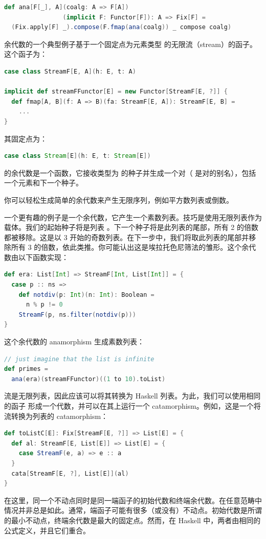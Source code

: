 \begin{lstlisting}[language=Scala]
def ana[F[_], A](coalg: A => F[A])
                (implicit F: Functor[F]): A => Fix[F] =
  (Fix.apply[F] _).compose(F.fmap(ana(coalg)) _ compose coalg)
\end{lstlisting}
余代数的一个典型例子基于一个固定点为元素类型  的无限流（stream）的函子。这个函子为：

\begin{lstlisting}[language=Scala]
case class StreamF[E, A](h: E, t: A)

implicit def streamFFunctor[E] = new Functor[StreamF[E, ?]] {
  def fmap[A, B](f: A => B)(fa: StreamF[E, A]): StreamF[E, B] =
    ...
}
\end{lstlisting}
其固定点为：

\begin{lstlisting}[language=Scala]
case class Stream[E](h: E, t: Stream[E])
\end{lstlisting}
 的余代数是一个函数，它接收类型为  的种子并生成一个对（ 是对的别名），包括一个元素和下一个种子。

你可以轻松生成简单的余代数来产生无限序列，例如平方数列表或倒数。

一个更有趣的例子是一个余代数，它产生一个素数列表。技巧是使用无限列表作为载体。我们的起始种子将是列表 \code{{[}2..{]}}。下一个种子将是此列表的尾部，所有 2 的倍数都被移除。这是以 3 开始的奇数列表。在下一步中，我们将取此列表的尾部并移除所有 3 的倍数，依此类推。你可能认出这是埃拉托色尼筛法的雏形。这个余代数由以下函数实现：

\begin{lstlisting}[language=Scala]
def era: List[Int] => StreamF[Int, List[Int]] = {
  case p :: ns =>
    def notdiv(p: Int)(n: Int): Boolean =
      n % p != 0
    StreamF(p, ns.filter(notdiv(p)))
}

\end{lstlisting}
这个余代数的 anamorphism 生成素数列表：

\begin{lstlisting}[language=Scala]
// just imagine that the list is infinite
def primes =
  ana(era)(streamFFunctor)((1 to 10).toList)
\end{lstlisting}
流是无限列表，因此应该可以将其转换为 Haskell 列表。为此，我们可以使用相同的函子  形成一个代数，并可以在其上运行一个 catamorphism。例如，这是一个将流转换为列表的 catamorphism：

\begin{lstlisting}[language=Scala]
def toListC[E]: Fix[StreamF[E, ?]] => List[E] = {
  def al: StreamF[E, List[E]] => List[E] = {
    case StreamF(e, a) => e :: a
  }
  cata[StreamF[E, ?], List[E]](al)
}
\end{lstlisting}
在这里，同一个不动点同时是同一端函子的初始代数和终端余代数。在任意范畴中情况并非总是如此。通常，端函子可能有很多（或没有）不动点。初始代数是所谓的最小不动点，终端余代数是最大的固定点。然而，在 Haskell 中，两者由相同的公式定义，并且它们重合。

